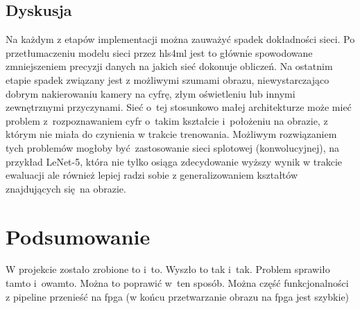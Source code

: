 \documentclass[12pt, oneside, a4paper]{article}
\begin{document}
\subsection{Dyskusja}
Na każdym z etapów implementacji można zauważyć spadek dokładności sieci.
Po przetłumaczeniu modelu sieci przez hls4ml jest to głównie spowodowane
zmniejszeniem precyzji danych na jakich sieć dokonuje obliczeń. 
Na ostatnim etapie spadek związany jest z możliwymi szumami obrazu,
niewystarczająco dobrym nakierowaniu kamery na cyfrę, złym oświetleniu lub
innymi zewnętrznymi przyczynami. Sieć o~tej stosunkowo małej architekturze
może mieć problem z~rozpoznawaniem cyfr o~takim kształcie i~położeniu
na obrazie, z którym nie miała do czynienia w trakcie trenowania.
Możliwym rozwiązaniem tych problemów mogłoby być zastosowanie sieci
splotowej (konwolucyjnej), na przykład \mbox{LeNet-5}, która nie tylko
osiąga zdecydowanie wyższy wynik w trakcie ewaluacji ale również lepiej
radzi sobie z generalizowaniem kształtów znajdujących się na obrazie.


\newpage
\section{Podsumowanie}
W projekcie zostało zrobione to i~to. Wyszło to tak i~tak. Problem sprawiło
tamto i~owamto. Można to poprawić w~ten sposób. Można część funkcjonalności
z pipeline przenieść na fpga (w końcu przetwarzanie obrazu na fpga jest szybkie)
\end{document}
